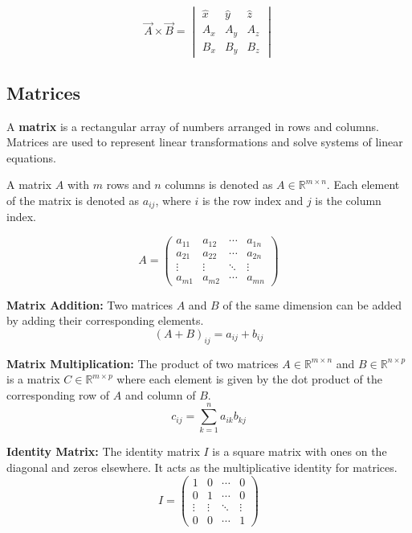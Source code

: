 \documentclass[11pt]{article}
\begin{document}
\[
    \vec{A} \times \vec{B} = \begin{vmatrix}
        \hat{x} & \hat{y} & \hat{z} \\
        A_x     & A_y     & A_z     \\
        B_x     & B_y     & B_z
    \end{vmatrix}
\]

\subsection{Matrices}
A \textbf{matrix} is a rectangular array of numbers arranged in rows and
columns. Matrices are used to represent linear transformations and solve
systems of linear equations.

\begin{definition}
    A matrix \(A\) with \(m\) rows and \(n\) columns is denoted as \(A \in \mathbb{R}^{m \times n}\). Each element of the matrix is denoted as \(a_{ij}\), where \(i\) is the row index and \(j\) is the column index.
\end{definition}

\begin{equation}
    A = \begin{pmatrix}
        a_{11} & a_{12} & \cdots & a_{1n} \\
        a_{21} & a_{22} & \cdots & a_{2n} \\
        \vdots & \vdots & \ddots & \vdots \\
        a_{m1} & a_{m2} & \cdots & a_{mn}
    \end{pmatrix}
\end{equation}

\textbf{Matrix Addition:} Two matrices \(A\) and \(B\) of the same dimension can be added by adding their corresponding elements.
\begin{equation}
    (A + B)_{ij} = a_{ij} + b_{ij}
\end{equation}

\textbf{Matrix Multiplication:} The product of two matrices \(A \in \mathbb{R}^{m \times n}\) and \(B \in \mathbb{R}^{n \times p}\) is a matrix \(C \in \mathbb{R}^{m \times p}\) where each element is given by the dot product of the corresponding row of \(A\) and column of \(B\).
\begin{equation}
    c_{ij} = \sum_{k=1}^{n} a_{ik} b_{kj}
\end{equation}

\textbf{Identity Matrix:} The identity matrix \(I\) is a square matrix with ones on the diagonal and zeros elsewhere. It acts as the multiplicative identity for matrices.
\begin{equation}
    I = \begin{pmatrix}
        1      & 0      & \cdots & 0      \\
        0      & 1      & \cdots & 0      \\
        \vdots & \vdots & \ddots & \vdots \\
        0      & 0      & \cdots & 1
    \end{pmatrix}
\end{equation}
\end{document}
